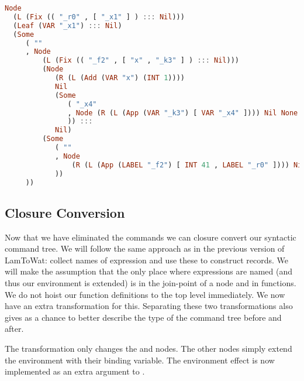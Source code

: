\begin{lstlisting}[language=Haskell]
Node
  (L (Fix (( "_r0" , [ "_x1" ] ) ::: Nil)))
  (Leaf (VAR "_x1") ::: Nil)
  (Some
     ( ""
     , Node
         (L (Fix (( "_f2" , [ "x" , "_k3" ] ) ::: Nil)))
         (Node
            (R (L (Add (VAR "x") (INT 1))))
            Nil
            (Some
               ( "_x4"
               , Node (R (L (App (VAR "_k3") [ VAR "_x4" ]))) Nil None
               )) :::
            Nil)
         (Some
            ( ""
            , Node
                (R (L (App (LABEL "_f2") [ INT 41 , LABEL "_r0" ]))) Nil None
            ))
     ))
\end{lstlisting}

\subsection{\label{subsection:closconvert2}Closure Conversion}
Now that we have eliminated the  commands we can closure convert our syntactic command tree. We will follow the same approach as in the previous version of LamToWat: collect names of expression and use these to construct records. We will make the assumption that the only place where expressions are named (and thus our environment is extended) is in the join-point of a node and in functions. We do not hoist our function definitions to the top level immediately. We now have an extra transformation for this. Separating these two transformations also gives as a chance to better describe the type of the command tree before and after.

The transformation only changes the  and  nodes. The other nodes simply extend the environment with their binding variable. The environment effect is now implemented as an extra argument to .

